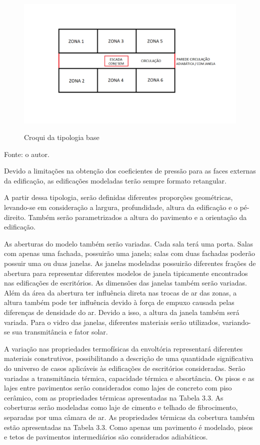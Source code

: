 \documentclass[brazil,hardcopy,openany,a5paper]{ufscthesis}
\begin{document}
		\begin{figure}[h]
			\centering
			\caption{Croqui da tipologia base}
			\includegraphics[width=1\linewidth]{img/CROQUI.png}
			\label{fig:croqui}
		\end{figure}
		\begin{flushleft}
			Fonte: o autor.
		\end{flushleft}
		
		Devido a limitações na obtenção dos coeficientes de pressão para as faces externas da edificação, as edificações modeladas terão sempre formato retangular.
		
		A partir dessa tipologia, serão definidas diferentes proporções geométricas, levando-se em consideração a largura, profundidade, altura da edificação e o pé-direito. Também serão parametrizados a altura do pavimento e a orientação da edificação.
		
		As aberturas do modelo também serão variadas. Cada sala terá uma porta. Salas com apenas uma fachada, possuirão uma janela; salas com duas fachadas poderão possuir uma ou duas janelas. As janelas modeladas possuirão diferentes frações de abertura para representar diferentes modelos de janela tipicamente encontrados nas edificações de escritórios. As dimensões das janelas também serão variadas. Além da área da abertura ter influência direta nas trocas de ar das zonas, a altura também pode ter influência devido à força de empuxo causada pelas diferenças de densidade do ar. Devido a isso, a altura da janela também será variada. Para o vidro das janelas, diferentes materiais serão utilizados, variando-se sua transmitância e fator solar.
		
		A variação nas propriedades termofísicas da envoltória representará diferentes materiais construtivos, possibilitando a descrição de uma quantidade significativa do universo de casos aplicáveis às edificações de escritórios consideradas. Serão variadas a transmitância térmica, capacidade térmica e absortância. Os pisos e as lajes entre pavimentos serão considerados como lajes de concreto com piso cerâmico, com as propriedades térmicas apresentadas na Tabela 3.3. As coberturas serão modeladas como laje de cimento e telhado de fibrocimento, separadas por uma câmara de ar. As propriedades térmicas da cobertura também estão apresentadas na Tabela 3.3. Como apenas um pavimento é modelado, pisos e tetos de pavimentos intermediários são considerados adiabáticos.
		
\end{document}
